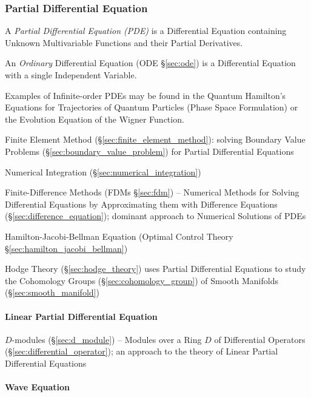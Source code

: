 \subsubsection{Partial Differential Equation}\label{sec:pde}

A \emph{Partial Differential Equation (PDE)} is a Differential Equation
containing Unknown Multivariable Functions and their Partial Derivatives.

\fist An \emph{Ordinary} Differential Equation (ODE \S\ref{sec:ode}) is a
Differential Equation with a single Independent Variable.

Examples of Infinite-order PDEs may be found in the Quantum Hamilton's Equations
for Trajectories of Quantum Particles (Phase Space Formulation) or the Evolution
Equation of the Wigner Function.

Finite Element Method (\S\ref{sec:finite_element_method}): solving Boundary
Value Problems (\S\ref{sec:boundary_value_problem}) for Partial Differential
Equations

\fist Numerical Integration (\S\ref{sec:numerical_integration})

\fist Finite-Difference Methods (FDMs \S\ref{sec:fdm}) -- Numerical Methods for
Solving Differential Equations by Approximating them with Difference Equations
(\S\ref{sec:difference_equation}); dominant approach to Numerical Solutions of
PDEs

\fist Hamilton-Jacobi-Bellman Equation (Optimal Control Theory
\S\ref{sec:hamilton_jacobi_bellman})

\fist Hodge Theory (\S\ref{sec:hodge_theory}) uses Partial Differential
Equations to study the Cohomology Groups (\S\ref{sec:cohomology_group}) of
Smooth Manifolds (\S\ref{sec:smooth_manifold})



\paragraph{Linear Partial Differential Equation}\label{sec:linear_pde}\hfill

\fist $D$-modules (\S\ref{sec:d_module}) -- Modules over a Ring $D$ of
Differential Operators (\S\ref{sec:differential_operator}); an approach to the
theory of Linear Partial Differential Equations



\paragraph{Wave Equation}\label{sec:wave_equation}\hfill

